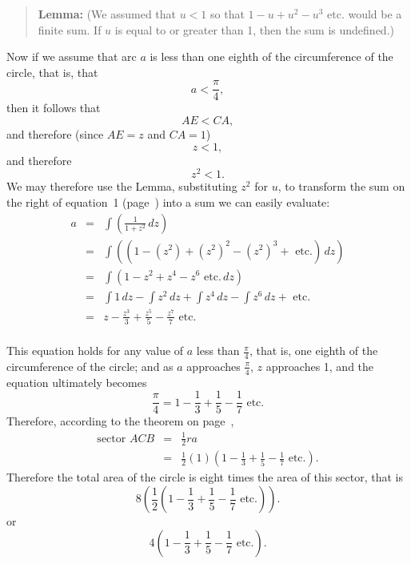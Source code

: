 \documentclass[polutonikogreek,english,twoside,openright]{article}
\begin{document}
\begin{enumerate}
\begin{quote} {\bf Lemma:}
 (We assumed that $u<1$ so that $1 - u + u^2 -u^3 \mbox{ etc.}$ would
 be a finite sum.  If $u$ is equal to or greater than 1, then the sum
 is undefined.)

\end{quote}
\vspace{2 ex}
 
Now if we assume that arc $a$ is less than one eighth of the
circumference of the circle, that is, that
 $$a < \frac{\pi}{4},$$
 then it follows that
$$AE < CA,$$
and therefore (since $AE = z$ and $CA =1$)
$$z<1,$$ and therefore
$$z^2<1.$$
We may therefore use the Lemma, substituting $z^2$ for $u$, to
transform the sum on the right of equation~1 (page~\pageref{ainteq})
into a sum we can easily evaluate:
\begin{eqnarray*}
  a & = &\int\! \left(\frac{1}{1+z^2}\,dz\right)\\
    & = & \int\!\left((1 -(z^2) + (z^2)^2 - (z^2)^3 + \mbox{ etc.})\,dz\right)\\
    & = & \int\!\left(1 - z^2 + z^4 -  z^6  \mbox{ etc.}\,dz \right)\\
    & = & \int\! 1\,dz - \int\! z^2\,dz + \int\!z^4\,dz - \int\! z^6\,dz +  \mbox{ etc.}\\
    & = & z - \frac{z^3}{3} + \frac{z^5}{5} -  \frac{z^7}{7} \mbox{ etc.}\\
\end{eqnarray*}
\end{enumerate}
This equation holds for any value of $a$ less than $\frac{\pi}{4}$,
that is, one eighth of the circumference of the circle; and as $a$
approaches $\frac{\pi}{4}$, $z$ approaches 1, and the equation
ultimately becomes
$$ \frac{\pi}{4}  = 1 -  \frac{1}{3} + \frac{1}{5} - \frac{1}{7} \mbox{ etc.}$$
Therefore, according to the theorem on page~\pageref{secarea}, 
\begin{eqnarray*}
  \mbox{sector }ACB & = & \frac{1}{2}ra\\
                    & = & \frac{1}{2}(1)\left(1 - \frac{1}{3} + \frac{1}{5} - \frac{1}{7} \mbox{ etc.}\right).
\end{eqnarray*}
Therefore the total area of the circle is eight times the area of this
sector, that is
$$8 \left(\frac{1}{2}\left(1 - \frac{1}{3} + \frac{1}{5} - \frac{1}{7}\mbox{ etc.}\right)\right).$$
or
$$4\left(1 - \frac{1}{3} + \frac{1}{5} - \frac{1}{7}\mbox{ etc.}\right).$$
\end{document}
